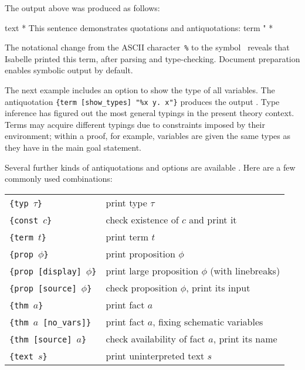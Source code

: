 \begin{isabellebody}
\begin{isamarkuptext}
  \medskip\noindent The output above was produced as follows:
  \begin{ttbox}
text {\ttlbrace}*
  This sentence demonstrates quotations and antiquotations:
  {\at}{\ttlbrace}term "%
*{\ttrbrace}
  \end{ttbox}\vspace{-\medskipamount}

  The notational change from the ASCII character~\verb,%, to the
  symbol~ reveals that Isabelle printed this term, after
  parsing and type-checking.  Document preparation enables symbolic
  output by default.

  \medskip The next example includes an option to show the type of all
  variables.  The antiquotation
  \texttt{{\at}}\verb,{term [show_types] "%x y. x"}, produces the
  output .  Type inference has figured
  out the most general typings in the present theory context.  Terms
  may acquire different typings due to constraints imposed by their
  environment; within a proof, for example, variables are given the
  same types as they have in the main goal statement.

  \medskip Several further kinds of antiquotations and options are
  available \cite{isabelle-isar-ref}.  Here are a few commonly used
  combinations:

  \medskip

  \begin{tabular}{ll}
  \texttt{\at}\verb,{typ,~$\tau$\verb,}, & print type $\tau$ \\
  \texttt{\at}\verb,{const,~$c$\verb,}, & check existence of $c$ and print it \\
  \texttt{\at}\verb,{term,~$t$\verb,}, & print term $t$ \\
  \texttt{\at}\verb,{prop,~$\phi$\verb,}, & print proposition $\phi$ \\
  \texttt{\at}\verb,{prop [display],~$\phi$\verb,}, & print large proposition $\phi$ (with linebreaks) \\
  \texttt{\at}\verb,{prop [source],~$\phi$\verb,}, & check proposition $\phi$, print its input \\
  \texttt{\at}\verb,{thm,~$a$\verb,}, & print fact $a$ \\
  \texttt{\at}\verb,{thm,~$a$~\verb,[no_vars]}, & print fact $a$, fixing schematic variables \\
  \texttt{\at}\verb,{thm [source],~$a$\verb,}, & check availability of fact $a$, print its name \\
  \texttt{\at}\verb,{text,~$s$\verb,}, & print uninterpreted text $s$ \\
  \end{tabular}


\end{isamarkuptext}
\end{isabellebody}
